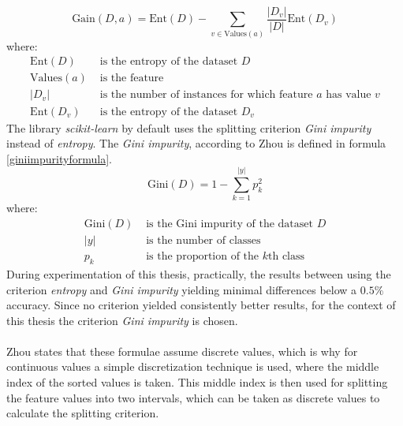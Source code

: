 \begin{equation} \label{infogainformula}
\text{Gain}(D, a) = \text{Ent}(D) - \sum_{v \in \text{Values}(a)} \frac{|D_v|}{|D|} \text{Ent}(D_v)
\end{equation}
where:
\begin{align*}
\text{Ent}(D) & \text{ is the entropy of the dataset } D \\
\text{Values}(a) & \text{ is the feature} \\
|D_v| & \text{ is the number of instances for which feature } a \text{ has value } v \\
\text{Ent}(D_v) & \text{ is the entropy of the dataset } D_v
\end{align*}
The library \textit{scikit-learn} \parencite{sklearnt33:online} by default uses the splitting criterion \textit{Gini impurity} instead of \textit{entropy}. The \textit{Gini impurity}, according to Zhou \parencite{zhou2021machine} is defined in formula \ref{giniimpurityformula}.
\begin{equation} \label{giniimpurityformula}
\text{Gini}(D) = 1- \sum_{k=1}^{|y|} p_k^2
\end{equation}
where:
\begin{align*}
\text{Gini}(D) & \text{ is the Gini impurity of the dataset } D \\
|y| & \text{ is the number of classes} \\
p_k & \text{ is the proportion of the } k \text{th class}
\end{align*}
During experimentation of this thesis, practically, the results between using the criterion \textit{entropy} and \textit{Gini impurity} yielding minimal differences below a $0.5\%$ accuracy. Since no criterion yielded consistently better results, for the context of this thesis the criterion \textit{Gini impurity} is chosen. 
\\\\
Zhou \parencite{zhou2021machine} states that these formulae assume discrete values, which is why for continuous values a simple discretization technique is used, where the middle index of the sorted values is taken. This middle index is then used for splitting the feature values into two intervals, which can be taken as discrete values to calculate the splitting criterion.


